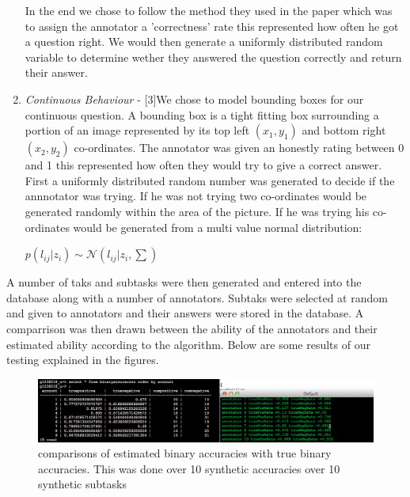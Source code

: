 \documentclass[11pt]{article}
\begin{document}
\begin{enumerate}
In the end we chose to follow the method they used in the paper which was to assign the annotator a 'correctness' rate this represented how often he got a question right. We would then generate a uniformly distributed random variable to determine wether they answered the question correctly and return their answer.


\item
\emph{Continuous Behaviour} - [3]We chose to model bounding boxes for our continuous question. A bounding box is a tight fitting box surrounding
a portion of an image represented by its top left $(x_{1}, y_{1})$ and bottom right $(x_{2}, y_{2})$ co-ordinates. The annotator was given
an honestly rating between 0 and 1 this represented how often they would try to give a correct answer. First a uniformly distributed random number
was generated to decide if the annnotator was trying. If he was not trying two co-ordinates would be generated randomly within the area of the
picture. If he was trying his co-ordinates would be generated from a multi value normal distribution:

$p(l_{ij} | z_{i}) \sim \mathcal{N}(l_{ij} | z_{i}, \sum )$


\end{enumerate}

A number of taks and subtasks were then generated and entered into the database along with a number of annotators. Subtaks were selected at random
and given to annotators and their answers were stored in the database. A comparrison was then drawn between the ability of the annotators and
their estimated ability according to the algorithm. Below are some results of our testing explained in the figures. 


\begin{figure}[H]
\begin{center}
\includegraphics[width=\linewidth]{images/test1.png}
\caption{comparisons of estimated binary accuracies with true binary accuracies. This was done over 10 synthetic accuracies over 10 synthetic subtasks}
\label{default}
\end{center}
\end{figure}
\end{document}
